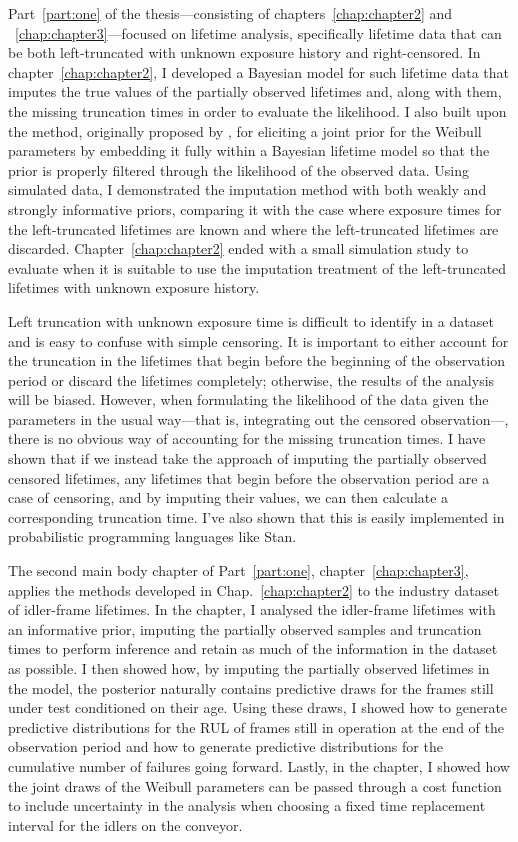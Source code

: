 Part~\ref{part:one} of the thesis---consisting of chapters~\ref{chap:chapter2} and ~\ref{chap:chapter3}---focused on lifetime analysis, specifically lifetime data that can be both left-truncated with unknown exposure history and right-censored. In chapter~\ref{chap:chapter2}, I developed a Bayesian model for such lifetime data that imputes the true values of the partially observed lifetimes and, along with them, the missing truncation times in order to evaluate the likelihood. I also built upon the method, originally proposed by \citet{kaminskiy2005}, for eliciting a joint prior for the Weibull parameters by embedding it fully within a Bayesian lifetime model so that the prior is properly filtered through the likelihood of the observed data. Using simulated data, I demonstrated the imputation method with both weakly and strongly informative priors, comparing it with the case where exposure times for the left-truncated lifetimes are known and where the left-truncated lifetimes are discarded. Chapter~\ref{chap:chapter2} ended with a small simulation study to evaluate when it is suitable to use the imputation treatment of the left-truncated lifetimes with unknown exposure history.

Left truncation with unknown exposure time is difficult to identify in a dataset and is easy to confuse with simple censoring. It is important to either account for the truncation in the lifetimes that begin before the beginning of the observation period or discard the lifetimes completely; otherwise, the results of the analysis will be biased. However, when formulating the likelihood of the data given the parameters in the usual way---that is, integrating out the censored observation---, there is no obvious way of accounting for the missing truncation times. I have shown that if we instead take the approach of imputing the partially observed censored lifetimes, any lifetimes that begin before the observation period are a case of censoring, and by imputing their values, we can then calculate a corresponding truncation time. I've also shown that this is easily implemented in probabilistic programming languages like Stan.

The second main body chapter of Part~\ref{part:one}, chapter~\ref{chap:chapter3}, applies the methods developed in Chap.~\ref{chap:chapter2} to the industry dataset of idler-frame lifetimes. In the chapter, I analysed the idler-frame lifetimes with an informative prior, imputing the partially observed samples and truncation times to perform inference and retain as much of the information in the dataset as possible. I then showed how, by imputing the partially observed lifetimes in the model, the posterior naturally contains predictive draws for the frames still under test conditioned on their age. Using these draws, I showed how to generate predictive distributions for the RUL of frames still in operation at the end of the observation period and how to generate predictive distributions for the cumulative number of failures going forward. Lastly, in the chapter, I showed how the joint draws of the Weibull parameters can be passed through a cost function to include uncertainty in the analysis when choosing a fixed time replacement interval for the idlers on the conveyor. 

